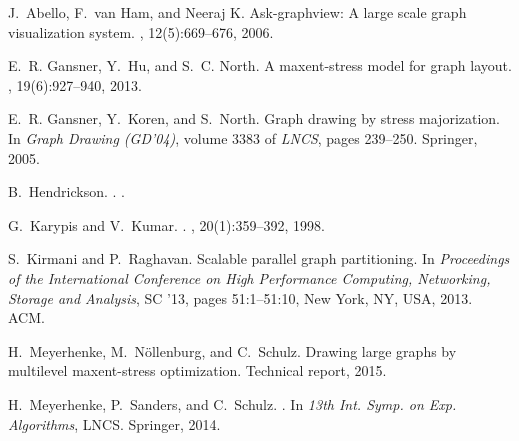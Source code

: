 \documentclass[11pt]{article}
\begin{document}
\vfill
\pagebreak
\vfill
\pagebreak

%
\begin{thebibliography}{1}

J.~Abello, F.~van Ham, and Neeraj K.
\newblock Ask-graphview: A large scale graph visualization system.
,
  12(5):669--676, 2006.

E.~R. Gansner, Y.~Hu, and S.~C. North.
\newblock A maxent-stress model for graph layout.
,
  19(6):927--940, 2013.

E.~R. Gansner, Y.~Koren, and S.~North.
\newblock Graph drawing by stress majorization.
\newblock In {\em Graph Drawing (GD'04)}, volume 3383 of {\em LNCS}, pages
  239--250. Springer, 2005.

B.~Hendrickson.
.
.

G.~Karypis and V.~Kumar.
.
, 20(1):359--392, 1998.

S.~Kirmani and P.~Raghavan.
\newblock Scalable parallel graph partitioning.
\newblock In {\em Proceedings of the International Conference on High
  Performance Computing, Networking, Storage and Analysis}, SC '13, pages
  51:1--51:10, New York, NY, USA, 2013. ACM.

H.~Meyerhenke, M.~Nöllenburg, and C.~Schulz.
\newblock Drawing large graphs by multilevel maxent-stress optimization.
\newblock Technical report, 2015.

H.~Meyerhenke, P.~Sanders, and C.~Schulz.
.
\newblock In {\em 13th Int. Symp. on Exp. Algorithms}, LNCS. Springer, 2014.

\end{thebibliography}
\end{document}
